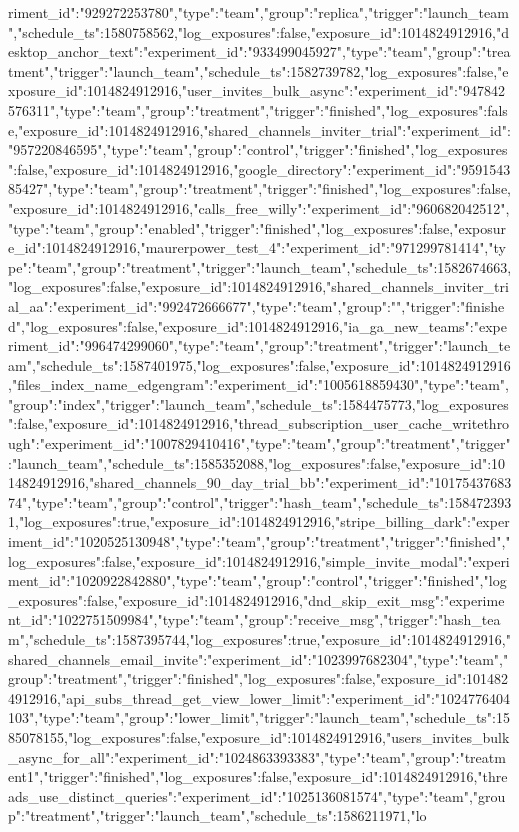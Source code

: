 {riment_id":"929272253780","type":"team","group":"replica","trigger":"launch_team","schedule_ts":1580758562,"log_exposures":false,"exposure_id":1014824912916},"desktop_anchor_text":{"experiment_id":"933499045927","type":"team","group":"treatment","trigger":"launch_team","schedule_ts":1582739782,"log_exposures":false,"exposure_id":1014824912916},"user_invites_bulk_async":{"experiment_id":"947842576311","type":"team","group":"treatment","trigger":"finished","log_exposures":false,"exposure_id":1014824912916},"shared_channels_inviter_trial":{"experiment_id":"957220846595","type":"team","group":"control","trigger":"finished","log_exposures":false,"exposure_id":1014824912916},"google_directory":{"experiment_id":"959154385427","type":"team","group":"treatment","trigger":"finished","log_exposures":false,"exposure_id":1014824912916},"calls_free_willy":{"experiment_id":"960682042512","type":"team","group":"enabled","trigger":"finished","log_exposures":false,"exposure_id":1014824912916},"maurerpower_test_4":{"experiment_id":"971299781414","type":"team","group":"treatment","trigger":"launch_team","schedule_ts":1582674663,"log_exposures":false,"exposure_id":1014824912916},"shared_channels_inviter_trial_aa":{"experiment_id":"992472666677","type":"team","group":"","trigger":"finished","log_exposures":false,"exposure_id":1014824912916},"ia_ga_new_teams":{"experiment_id":"996474299060","type":"team","group":"treatment","trigger":"launch_team","schedule_ts":1587401975,"log_exposures":false,"exposure_id":1014824912916},"files_index_name_edgengram":{"experiment_id":"1005618859430","type":"team","group":"index","trigger":"launch_team","schedule_ts":1584475773,"log_exposures":false,"exposure_id":1014824912916},"thread_subscription_user_cache_writethrough":{"experiment_id":"1007829410416","type":"team","group":"treatment","trigger":"launch_team","schedule_ts":1585352088,"log_exposures":false,"exposure_id":1014824912916},"shared_channels_90_day_trial_bb":{"experiment_id":"1017543768374","type":"team","group":"control","trigger":"hash_team","schedule_ts":1584723931,"log_exposures":true,"exposure_id":1014824912916},"stripe_billing_dark":{"experiment_id":"1020525130948","type":"team","group":"treatment","trigger":"finished","log_exposures":false,"exposure_id":1014824912916},"simple_invite_modal":{"experiment_id":"1020922842880","type":"team","group":"control","trigger":"finished","log_exposures":false,"exposure_id":1014824912916},"dnd_skip_exit_msg":{"experiment_id":"1022751509984","type":"team","group":"receive_msg","trigger":"hash_team","schedule_ts":1587395744,"log_exposures":true,"exposure_id":1014824912916},"shared_channels_email_invite":{"experiment_id":"1023997682304","type":"team","group":"treatment","trigger":"finished","log_exposures":false,"exposure_id":1014824912916},"api_subs_thread_get_view_lower_limit":{"experiment_id":"1024776404103","type":"team","group":"lower_limit","trigger":"launch_team","schedule_ts":1585078155,"log_exposures":false,"exposure_id":1014824912916},"users_invites_bulk_async_for_all":{"experiment_id":"1024863393383","type":"team","group":"treatment1","trigger":"finished","log_exposures":false,"exposure_id":1014824912916},"threads_use_distinct_queries":{"experiment_id":"1025136081574","type":"team","group":"treatment","trigger":"launch_team","schedule_ts":1586211971,"lo}
